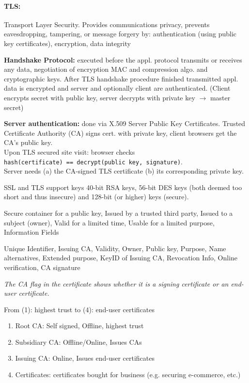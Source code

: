 \paragraph{TLS:} Transport Layer Security. Provides communications privacy, prevents eavesdropping, tampering, or message forgery by: authentication (using public key certificates), encryption, data integrity

\textbf{Handshake Protocol:} executed before the appl. protocol transmits or receives any data, negotiation of encryption MAC and compression algo. and cryptographic keys. After TLS handshake procedure finished transmitted appl. data is encrypted and server and optionally client are authenticated. (Client encrypts secret with public key, server decrypts with private key $\to$ master secret)

\textbf{Server authentication:} done via X.509 Server Public Key Certificates. Trusted Certificate Authority (CA) signs cert. with private key, client browsers get the CA's public key.\\
Upon TLS secured site visit: browser checks\\ {\tt hash(certificate) == decrypt(public key, signature)}.\\
Server needs (a) the CA-signed TLS certificate (b) its corresponding private key.

 SSL and TLS support keys 40-bit RSA keys, 56-bit DES keys (both deemed too short and thus insecure) and 128-bit (or higher) keys (secure).

 Secure container for a public key,
Issued by a trusted third party,
Issued to a subject (owner),
Valid for a limited time,
Usable for a limited purpose,
Information Fields

 Unique Identifier, Issuing CA, Validity, Owner, Public key, Purpose, Name alternatives, Extended purpose, KeyID of Issuing CA, Revocation Info, Online verification, CA signature

\textit{The CA flag in the certificate shows whether it is a signing certificate or an end-user certificate.}

 From (1): highest trust to (4): end-user certificates
\begin{enumerate}
\item Root CA: Self signed, Offline, highest trust
\item Subsidiary CA: Offline/Online, Issues CAs
\item Issuing CA: Online, Issues end-user certificates
\item Certificates: certificates bought for business (e.g. securing e-commerce, etc.)
\end{enumerate}


